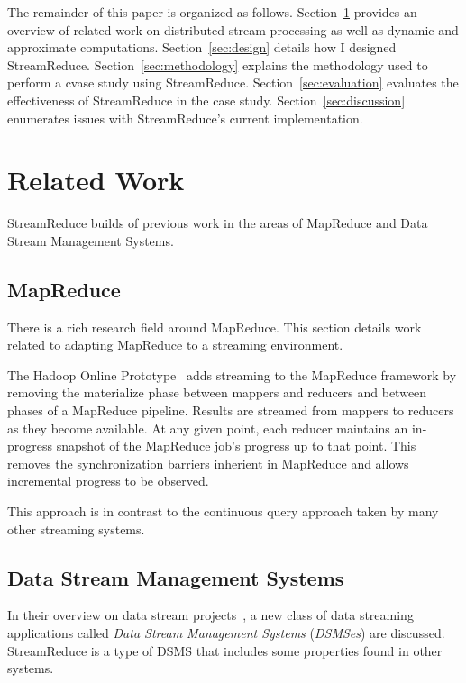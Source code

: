 \documentclass[12pt,twocolumn]{article}
\begin{document}
The remainder of this paper is organized as follows. Section~\ref{sec:relwork} provides
an overview of related work on distributed stream processing as well as dynamic and
approximate computations. Section~\ref{sec:design} details how I designed StreamReduce.
Section~\ref{sec:methodology} explains the methodology used to perform a cvase study
using StreamReduce. Section~\ref{sec:evaluation} evaluates the effectiveness of StreamReduce in the case study.
Section~\ref{sec:discussion} enumerates issues with StreamReduce's current implementation.

\section{Related Work}
\label{sec:relwork}
%

StreamReduce builds of previous work in the areas of MapReduce and Data Stream Management Systems.

\subsection{MapReduce}
There is a rich research field around MapReduce. This section details work related to adapting
MapReduce to a streaming environment.

The Hadoop Online Prototype~\cite{Condie:EECS-2009-136} adds streaming to the MapReduce framework
by removing the materialize phase between mappers and reducers and between phases of a
MapReduce pipeline. Results are streamed from mappers to reducers as they become available.
At any given point, each reducer maintains an in-progress snapshot of the MapReduce job's
progress up to that point. This removes the synchronization barriers inherient in MapReduce
and allows incremental progress to be observed.

This approach is in contrast to the continuous query approach taken by many other streaming
systems.

\subsection{Data Stream Management Systems}
In their overview on data stream projects~\cite{Babcock:2002:MID:543613.543615},
a new class of data streaming applications
called \emph{Data Stream Management Systems} (\emph{DSMSes}) are discussed. StreamReduce is a type of DSMS that
includes some properties found in other systems.
\end{document}
